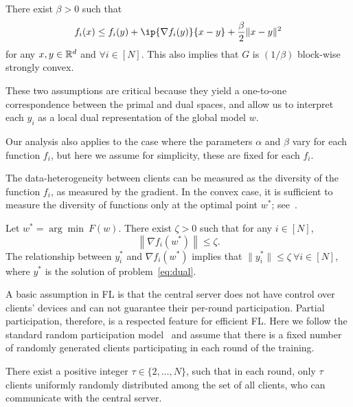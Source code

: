 \begin{assumption}[Smoothness] \label{assum:smooth}
    There exist $\beta > 0$ such that
    \[
      f_i(x) \leq f_i(y)+ \ip{\nabla f_i(y)}{x-y} + \frac{\beta}{2} \| x - y \|^2
    \]
    for any $x, y \in \mathbb{R}^d$ and $\forall i \in [N]$. This also implies that $G$ is $(1/\beta)$ block-wise strongly convex. 
\end{assumption}

These two assumptions are critical because they yield a one-to-one correspondence between the primal and dual spaces, and allow us to interpret each $y_i$ as a local dual representation of the global model $w$. 

Our analysis also applies to the case where the parameters $\alpha$ and $\beta$ vary for each function $f_i$, but here we assume for simplicity, these are fixed for each $f_i$. 

The data-heterogeneity between clients can be measured as the diversity of the function $f_i$, as measured by the gradient. In the convex case, it is sufficient to measure the diversity of functions only at the optimal point $w^*$; see~\citet[Assumption~3a]{koloskova2020unified}. 
\begin{assumption} \label{assum:dissimilar}
  Let $w^* = \arg\min~ F(w)$. There exist $\zeta>0$ such that for any $i \in [N]$,
  \[
    \left\|\nabla f_i(w^*) \right\| \leq \zeta.
  \] The relationship between $y_i^*$ and $\nabla f_i(w^*)$ implies that $\|y_i^*\| \leq \zeta ~\forall i \in [N]$, where $y^*$ is the solution of problem~\eqref{eq:dual}. 
\end{assumption}

A basic assumption in FL is that the central server does not have control over clients' devices and can not guarantee their per-round participation. Partial participation, therefore, is a respected feature for efficient FL. Here we follow the standard random participation model~\citep{wang2021field,li2020federated,li2019convergence} and assume that there is a fixed number of randomly generated clients participating in each round of the training.

\begin{assumption} \label{assum:partial}
    There exist a positive integer $\tau \in \{2,\dots,N\}$, such that in each round, only $\tau$ clients uniformly randomly distributed among the set of all clients, who can communicate with the central server.
\end{assumption}

